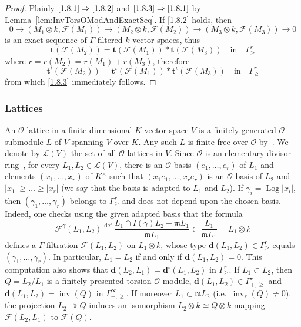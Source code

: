 \documentclass[11pt]{article}
\theoremstyle{definition}
\numberwithin{equation}{section}
\numberwithin{figure}{section}
\numberwithin{table}{section}
\DeclareMathOperator{\inv}{inv}
\DeclareMathOperator{\Log}{Log}
\newcommand{\eqd}{\stackrel{\mathrm{def}}{=}}
\begin{document}
\begin{proof}
Plainly $\eqref{1.8.1}\Rightarrow\eqref{1.8.2}$ and $\eqref{1.8.3}\Rightarrow\eqref{1.8.1}$ by Lemma~\ref{lem:InvTorsOModAndExactSeq}. If \eqref{1.8.2} holds, then
\[
0\rightarrow\left(M_{1}\otimes k,\mathcal{F}(M_{1})\right)\rightarrow\left(M_{2}\otimes k,\mathcal{F}(M_{2})\right)\rightarrow\left(M_{3}\otimes k,\mathcal{F}(M_{3})\right)\rightarrow0
\]
is an exact sequence of $\Gamma$-filtered $k$-vector spaces, thus
\[
\mathbf{t}(\mathcal{F}(M_{2}))=\mathbf{t}(\mathcal{F}(M_{1}))\ast\mathbf{t}(\mathcal{F}(M_{3}))\quad\text{in}\quad\Gamma_{\geq}^{r}
\]
where $r=r(M_{2})=r(M_{1})+r(M_{3})$, therefore
\[
\mathbf{t}^{\iota}(\mathcal{F}(M_{2}))=\mathbf{t}^{\iota}(\mathcal{F}(M_{1}))\ast\mathbf{t}^{\iota}(\mathcal{F}(M_{3}))\quad\text{in}\quad\Gamma_{\geq}^{r}
\]
from which \eqref{1.8.3} immediately follows.
\end{proof}

\subsubsection{Lattices}\label{subsec:Lattices}

An $\mathcal{O}$-lattice in a finite dimensional $K$-vector space $V$ is a finitely generated $\mathcal{O}$-submodule $L$ of $V$ spanning $V$ over $K$. Any such $L$ is finite free over $\mathcal{O}$ by~\cite[VI, \S 3, 6, Lemme~1]{BoAC56}. We denote by $\mathcal{L}(V)$ the set of all $\mathcal{O}$-lattices in $V$. Since $\mathcal{O}$ is an elementary divisor ring~\cite[\S 10]{Ka66}, for every $L_{1},L_{2}\in\mathcal{L}(V)$, there is an $\mathcal{O}$-basis $(e_{1},\dots,e_{r})$ of $L_{1}$ and elements $(x_{1},\dots,x_{r})$ of $K^{\times}$ such that $(x_{1}e_{1},\dots,x_{r}e_{r})$ is an $\mathcal{O}$-basis of $L_{2}$ and $\left|x_{1}\right|\geq\dots\geq\left|x_{r}\right|$ (we say that the basis is adapted to $L_{1}$ and $L_{2}$). If $\gamma_{i}=\Log\left|x_{i}\right|$, then $(\gamma_{1},\dots,\gamma_{r})$ belongs to $\Gamma_{\geq}^{r}$ and does not depend upon the chosen basis. Indeed, one checks using the given adapted basis that the formula
\[
\mathcal{F}^{\gamma}(L_{1},L_{2})\eqd\frac{L_{1}\cap I(\gamma)L_{2}+\mathfrak{m}L_{1}}{\mathfrak{m}L_{1}}\subset\frac{L_{1}}{\mathfrak{m}L_{1}}=L_{1}\otimes k
\]
defines a $\Gamma$-filtration $\mathcal{F}(L_{1},L_{2})$ on $L_{1}\otimes k$, whose type $\mathbf{d}(L_{1},L_{2})\in\Gamma_{\geq}^{r}$ equals $(\gamma_{1},\dots,\gamma_{r})$. In particular, $L_{1}=L_{2}$ if and only if $\mathbf{d}(L_{1},L_{2})=0$. This computation also shows that $\mathbf{d}(L_{2},L_{1})=\mathbf{d}^{\iota}(L_{1},L_{2})$ in $\Gamma_{\geq}^{r}$. If $L_{1}\subset L_{2}$, then $Q=L_{2}/L_{1}$ is a finitely presented torsion $\mathcal{O}$-module, $\mathbf{d}(L_{1},L_{2})\in\Gamma_{+,\geq}^{r}$ and $\mathbf{d}(L_{1},L_{2})=\inv(Q)$ in $\Gamma_{+,\geq}^{\infty}$. If moreover $L_{1}\subset\mathfrak{m}L_{2}$ (i.e.~$\inv_{r}(Q)\neq0$), the projection $L_{2}\twoheadrightarrow Q$ induces an isomorphism $L_{2}\otimes k\simeq Q\otimes k$ mapping $\mathcal{F}(L_{2},L_{1})$ to $\mathcal{F}(Q)$.
\end{document}
